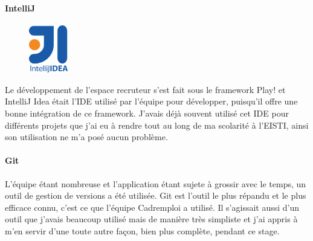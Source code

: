 \paragraph{IntelliJ}
\label{par:IntelliJ}
\begin{figure}
  \vspace{-2.5em}
  \begin{center}
    \includegraphics[width=0.15\textwidth]{Pictures/intellij_logo.png}
  \end{center}
\end{figure}
Le développement de l'espace recruteur s'est fait sous le framework Play! et IntelliJ Idea était l'IDE utilisé par l'équipe pour développer, puisqu'il offre une bonne intégration de ce framework.
J'avais déjà souvent utilisé cet IDE pour différents projets que j'ai eu à rendre tout au long de ma scolarité à l'EISTI, ainsi son utilisation ne m'a posé aucun problème.
\paragraph{Git}
\label{par:Git}
L'équipe étant nombreuse et l'application étant sujete à grossir avec le temps, un outil de gestion de versions a été utilisée.
Git est l'outil le plus répandu et le plus efficace connu, c'est ce que l'équipe Cadremploi a utilisé.
Il s'agissait aussi d'un outil que j'avais beaucoup utilisé mais de manière très simpliste et j'ai appris à m'en servir d'une toute autre façon, bien plus complète, pendant ce stage.
